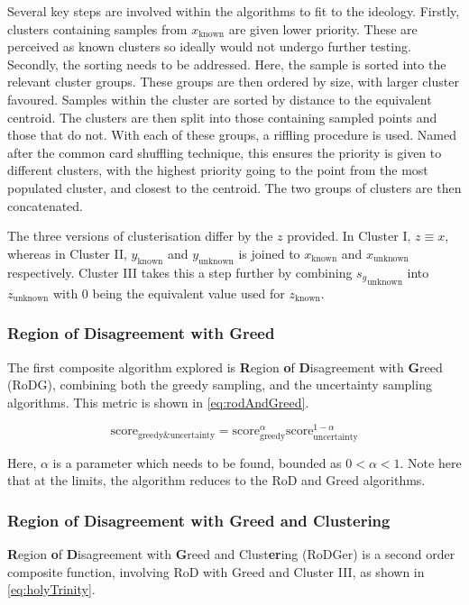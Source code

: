 Several key steps are involved within the algorithms to fit to the ideology. Firstly, clusters containing samples from $x_\mathrm{known}$ are given lower priority. These are perceived as known clusters so ideally would not undergo further testing. Secondly, the sorting needs to be addressed. Here, the sample is sorted into the relevant cluster groups. These groups are then ordered by size, with larger cluster favoured. Samples within the cluster are sorted by distance to the equivalent centroid. The clusters are then split into those containing sampled points and those that do not. With each of these groups, a riffling procedure is used. Named after the common card shuffling technique, this ensures the priority is given to different clusters, with the highest priority going to the point from the most populated cluster, and closest to the centroid. The two groups of clusters are then concatenated.

The three versions of clusterisation differ by the $z$ provided. In Cluster I, $z\equiv{}x$, whereas in Cluster II, $y_\mathrm{known}$ and $y_\mathrm{unknown}$ is joined to $x_\mathrm{known}$ and $x_\mathrm{unknown}$ respectively. Cluster III takes this a step further by combining ${s_g}_\mathrm{unknown}$ into $z_\mathrm{unknown}$ with 0 being the equivalent value used for $z_\mathrm{known}$.

\subsubsection{Region of Disagreement with Greed}
The first composite algorithm explored is \textbf{R}egion \textbf{o}f \textbf{D}isagreement with \textbf{G}reed (RoDG), combining both the greedy sampling, and the uncertainty sampling algorithms. This metric is shown in \ref{eq:rodAndGreed}.

\begin{equation}
  \label{eq:rodAndGreed}
  {\mathrm{score}_\mathrm{greedy\&uncertainty}=\mathrm{score}_\mathrm{greedy}^{\alpha}\mathrm{score}_\mathrm{uncertainty}^{1-\alpha}}
\end{equation}

Here, $\alpha$ is a parameter which needs to be found, bounded as $0<\alpha{}<1$. Note here that at the limits, the algorithm reduces to the RoD and Greed algorithms.

\subsubsection{Region of Disagreement with Greed and Clustering}
\textbf{R}egion \textbf{o}f \textbf{D}isagreement with \textbf{G}reed and Clust\textbf{er}ing (RoDGer) is a second order composite function, involving RoD with Greed and Cluster III, as shown in \ref{eq:holyTrinity}.


